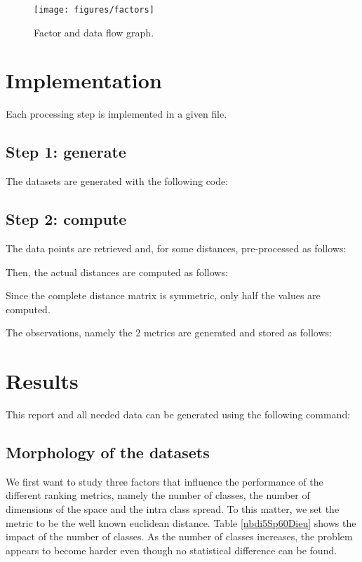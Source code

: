 \documentclass[12pt,a4paper,fleqn]{tufte-handout}
\begin{document}
\begin{figure}
\texttt{[image: figures/factors]}
\caption{Factor and data flow graph.}
\label{scatter}
\end{figure}

\section{Implementation}

Each processing step is implemented in a given file.

\subsection{Step 1: generate}

The datasets are generated with the following code:


\subsection{Step 2: compute} 


The data points are retrieved and, for some distances, pre-processed as follows:
 

Then, the actual distances are computed as follows:
 
Since the complete distance matrix is symmetric, only half the values are computed.

The observations, namely the 2 metrics  are generated and stored as follows:
   

\section{Results}

This report and all needed data can be generated using the following command:


\subsection{Morphology of the datasets}

We first want to study three factors that influence the performance of the different ranking metrics, namely the number of classes, the number of dimensions of the space and the intra class spread. To this matter, we set the metric to be the well known euclidean distance. Table \ref{nbdi5Sp60Dieu} shows the impact of the number of classes. As the number of classes increases, the problem appears to become harder even though no statistical difference can be found.
\end{document}
